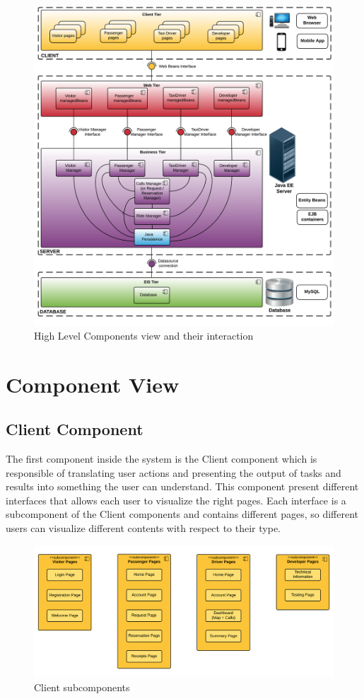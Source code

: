 \begin{figure}[htbp]
\centering
\includegraphics[width=\textwidth]{cpt/img/HighLevelComponentView}
\caption{High Level Components view and their interaction}
\label{fig:HLC}
\end{figure}
\clearpage

\section{Component View}
\subsection{Client Component}
The first component inside the system is the Client component which is responsible of translating user actions and presenting the output of tasks and results into something the user can understand. This component present different interfaces that allows each user to visualize the right pages. Each interface is a subcomponent of the Client components and contains different pages, so different users can visualize different contents with respect to their type.

\begin{figure}[htbp]
\centering
\includegraphics[width=\textwidth]{cpt/img/ClientInterfaces}
\caption{Client subcomponents}
\end{figure}
\clearpage


